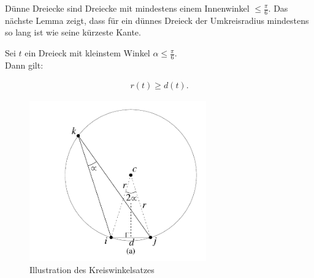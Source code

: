 Dünne Dreiecke sind Dreiecke mit mindestens einem Innenwinkel $\leq \frac{\pi}{6}$.  
Das nächste Lemma zeigt, dass für ein dünnes Dreieck der Umkreisradius mindestens so lang ist wie seine kürzeste Kante.


   




\begin{lemma}
\label{le:dünnes_dreieck}
Sei $t$ ein Dreieck mit kleinstem Winkel $\alpha \leq \frac{\pi}{6}$.\\
Dann gilt: 
 
 \begin{align*}
     r(t) \geq d(t).
 \end{align*} 
 \end{lemma}

\begin{figure}[h]
    \centering
    \includegraphics[width=3in]{images/Kreiswinkelsatz.png}
    \caption{Illustration des Kreiswinkelsatzes~\cite{shewchuk:1997:delaunay}}
    \label{fig:kreiswinkelsatz}
\end{figure}


